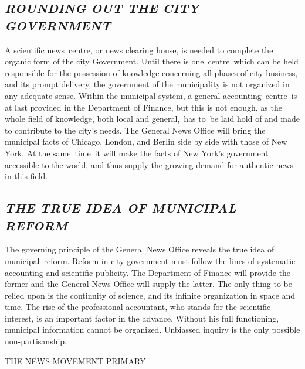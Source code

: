 \documentclass[twoside,symmetric,nobib,justified]{tufte-book}
\begin{document}
\hypertarget{rounding-out-the-city-government}{%
\subsection{\emph{ROUNDING OUT THE CITY
GOVERNMENT}}\label{rounding-out-the-city-government}}

A scientific news~centre, or news clearing house, is needed to complete
the organic form of the city Government. Until there is one~centre~which
can be held responsible for the possession of knowledge concerning all
phases of city business, and its prompt delivery, the government of the
municipality is not organized in any adequate sense. Within the
municipal system, a general accounting~centre~is at last provided in the
Department of Finance, but this is not enough, as the whole field of
knowledge, both local and general,~has to~be laid hold of and made to
contribute to the city's needs. The General News Office will bring the
municipal facts of Chicago, London, and Berlin side by side with those
of New York. At the same~time~it will make the facts of New York's
government accessible to the world, and thus supply the growing demand
for authentic news in this field.~

\hypertarget{the-true-idea-of-municipal-reform}{%
\subsection{\emph{THE TRUE IDEA OF MUNICIPAL
REFORM}}\label{the-true-idea-of-municipal-reform}}

The governing principle of the General News Office reveals the true idea
of municipal~reform. Reform in city government must follow the lines of
systematic accounting and scientific publicity. The Department of
Finance will provide the former and the General News Office will supply
the latter. The only thing to be relied upon is the continuity of
science, and its infinite organization in space and time. The rise of
the professional accountant, who stands for the scientific interest, is
an important factor in the advance. Without his full functioning,
municipal information cannot be organized. Unbiassed inquiry is the only
possible non-partisanship.~

\newpage\begin{center}


{\LARGE THE NEWS MOVEMENT PRIMARY}

\end{center}


\end{document}
